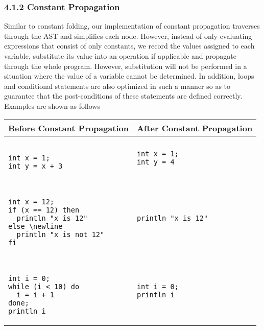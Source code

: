 \documentclass[10pt,a4paper]{report}
\newenvironment{tabularverbatim}
 {\VerbatimEnvironment
  \begin{BVerbatim}[baseline=c,formatcom=\setlength{\baselineskip}{\normalbaselineskip}]}
 {\end{BVerbatim}}
\begin{document}
  \subsubsection*{4.1.2 Constant Propagation}
  Similar to constant folding, our implementation of constant propagation
  traverses through the AST and simplifies each node. However, instead of only
  evaluating expressions that consist of only constants, we record the values
  assigned to each variable, substitute its value into an operation if
  applicable and propagate through the whole program. However, substitution will
  not be performed in a situation where the value of a variable cannot be
  determined. In addition, loops and conditional statements are also optimized
  in such a manner so as to guarantee that the post-conditions of these
  statements are defined correctly. Examples are shown as follows 

  \begin{center}
    \begin{tabular}{| m{5cm} | m{5cm} |}
      \hline
      Before Constant Propagation & After Constant Propagation \\
      \hline
      \begin{tabularverbatim}

int x = 1;
int y = x + 3

      \end{tabularverbatim}
       &
      \begin{tabularverbatim}
int x = 1; 
int y = 4
      \end{tabularverbatim}
      \\
      \hline
      \begin{tabularverbatim}
      
int x = 12;
if (x == 12) then
  println "x is 12"
else \newline
  println "x is not 12"
fi

      \end{tabularverbatim}
      &
      \begin{tabularverbatim}
println "x is 12"
      \end{tabularverbatim}
      \\
      \hline
      \begin{tabularverbatim}

int i = 0;
while (i < 10) do
  i = i + 1
done;
println i

      \end{tabularverbatim}
      &
      \begin{tabularverbatim}
int i = 0;
println i
      \end{tabularverbatim}
      \\
      \hline
    \end{tabular}
  \end{center}
\end{document}
